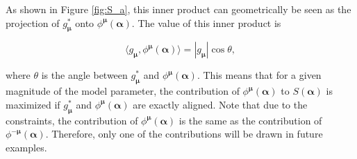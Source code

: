 \noindent
As shown in Figure \ref{fig:S_a}, this inner product can geometrically be seen as the projection of $g_{\boldsymbol{\mu}}^*$ onto $\phi^{\boldsymbol{\mu}}(\boldsymbol{\alpha})$.
The value of this inner product is

\begin{equation}
    \langle g_{\boldsymbol{\mu}}, \phi^{\boldsymbol{\mu}}(\boldsymbol{\alpha}) \rangle = |g_{\boldsymbol{\mu}}| \cos \theta,
\end{equation}

\noindent
where $\theta$ is the angle between $g_{\boldsymbol{\mu}}^*$ and $\phi^{\boldsymbol{\mu}}(\boldsymbol{\alpha})$.
This means that for a given magnitude of the model parameter, the contribution of $\phi^{\boldsymbol{\mu}}(\boldsymbol{\alpha})$ to $S(\boldsymbol{\alpha})$ is maximized if $g_{\boldsymbol{\mu}}^*$ and $\phi^{\boldsymbol{\mu}}(\boldsymbol{\alpha})$ are exactly aligned.
Note that due to the constraints, the contribution of $\phi^{\boldsymbol{\mu}}(\boldsymbol{\alpha})$ is the same as the contribution of $\phi^{-\boldsymbol{\mu}}(\boldsymbol{\alpha})$.
Therefore, only one of the contributions will be drawn in future examples.

